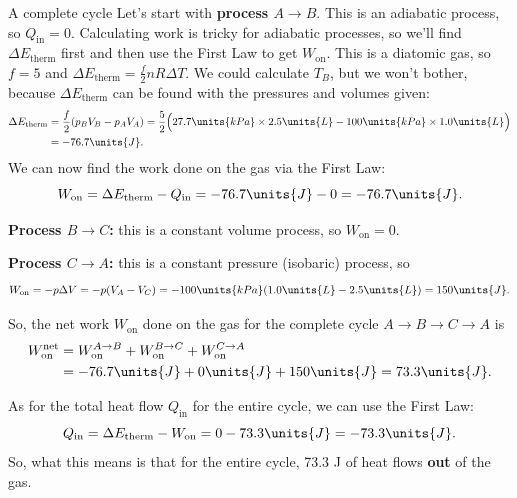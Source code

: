 \begin{example}{A complete cycle}
Let's start with {\bf process $A \rightarrow B$}.  This is an adiabatic process,
so $Q_\text{in} = 0$. Calculating work is tricky for adiabatic processes,
so we'll find $\Delta E_\text{therm}$ first and then use the First Law to get
$W_\text{on}$. This is a diatomic gas, so $f = 5$ and $\Delta E_\text{therm} =
\frac{f}{2}nR\Delta T$. We could calculate $T_B$, but we won't bother,
because $\Delta E_\text{therm}$ can be found with the pressures and volumes
given:
\begin{align}
\Delta E_\text{therm} &= \frac{f}{2}(p_BV_B - p_AV_A) = \frac{5}{2}
\Bigl(27.7 \units{kPa} \times 2.5 \units{L} -
100 \units{kPa}\times 1.0 \units{L}\Bigr)
\nonumber\\ &= -76.7 \units{J}.
\end{align}
We can now find the work done on the gas via the First Law:
\begin{equation}
  W_\text{on} = \Delta E_\text{therm} - Q_\text{in} =
  -76.7 \units{J} - 0 = -76.7 \units{J}.
\end{equation}

{\bf Process $B \rightarrow C$:} this is a constant volume process, so 
$W_\text{on} = 0$.


{\bf Process $C \rightarrow A$:} this is a constant pressure (isobaric)
process, so
\begin{equation}
  W_\text{on} = -p\Delta V = -p(V_A - V_C) = -100 \units{kPa}(1.0
\units{L} - 2.5 \units{L}) = 150 \units{J}.
\end{equation}

So, the net work $W_\text{on}$ done on the gas for the complete cycle 
$A \rightarrow B \rightarrow C \rightarrow A$ is
\begin{align}
  W_\text{on}^\text{net} &= W_\text{on}^{A\to B}+W_\text{on}^{B\to C}+W_\text{on}^{C\to A}
  \nonumber\\
   &= -76.7 \units{J} + 0\units{J}
+ 150 \units{J} = 73.3 \units{J}.
\end{align}

As for the total heat flow $Q_\text{in}$ for the entire cycle, we can use
the First Law:
\begin{equation}
  Q_\text{in} = \Delta E_\text{therm} - W_\text{on} = 0 - 73.3 \units{J}
  = -73.3 \units{J}.
\end{equation}
So, what this
means is that for the entire cycle, 73.3 J of heat flows {\bf out} of
the gas.

\end{example}


